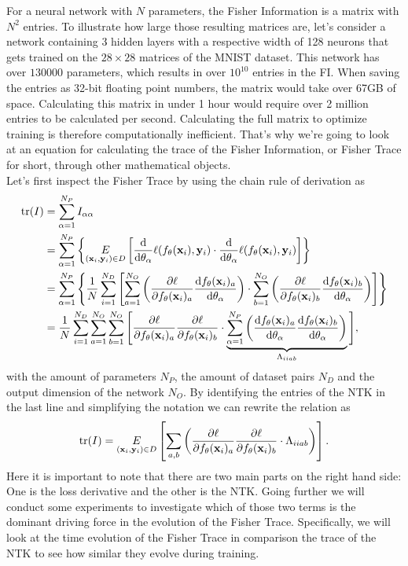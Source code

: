 For a neural network with $N$ parameters, the Fisher Information is a matrix with $N^2$ entries. To illustrate how large those resulting matrices are, let's consider a network containing 3 hidden layers with a respective width of 128 neurons that gets trained on the $28\times28$ matrices of the MNIST dataset. This network has over $130000$ parameters, which results in over $10^{10}$ entries in the FI. When saving the entries as 32-bit floating point numbers, the matrix would take over 67GB of space. Calculating  this matrix in under 1 hour would require over 2 million entries to be calculated per second. Calculating the full matrix to optimize training is therefore computationally inefficient. That's why we're going to look at an equation for calculating the trace of the Fisher Information, or Fisher Trace for short, through other mathematical objects.\\
Let's first inspect the Fisher Trace by using the chain rule of derivation as
\begin{equation}
	\begin{split}
		\mathrm{tr}(I) &= \sum_{\alpha = 1}^{N_P} I_{\alpha\alpha}\\
		&= \sum_{\alpha = 1}^{N_P} \left\{\underset{(\mathbf{x}_i, \mathbf{y}_i) \in D}{E} \left[\frac{\mathrm{d}}{\mathrm{d}\theta_\alpha}\ell(f_\theta(\mathbf{x}_i),\mathbf{y}_i)\cdot \frac{\mathrm{d}}{\mathrm{d}\theta_\alpha}\ell(f_\theta(\mathbf{x}_i),\mathbf{y}_i)\right]\right\}\\
		&= \sum_{\alpha = 1}^{N_P} \left\{ \frac{1}{N} \sum_{i = 1}^{N_D} \left[\sum_{a=1}^{N_O}\left(\frac{\partial\ell}{\partial f_\theta(\mathbf{x}_i)_a}\frac{\mathrm{d}f_\theta(\mathbf{x}_i)_a}{\mathrm{d}\theta_\alpha}\right)\cdot\sum_{b=1}^{N_O}\left(\frac{\partial\ell}{\partial f_\theta(\mathbf{x}_i)_b}\frac{\mathrm{d}f_\theta(\mathbf{x}_i)_b}{\mathrm{d}\theta_\alpha}\right)\right]\right\}\\
		&= \frac{1}{N} \sum_{i = 1}^{N_D} \sum_{a=1}^{N_O} \sum_{b=1}^{N_O} \Bigg[\frac{\partial\ell}{\partial f_\theta(\mathbf{x}_i)_a}\frac{\partial\ell}{\partial f_\theta(\mathbf{x}_i)_b} \cdot\underbrace{ \sum_{\alpha = 1}^{N_P} \left(\frac{\mathrm{d}f_\theta(\mathbf{x}_i)_a}{\mathrm{d}\theta_\alpha}\frac{\mathrm{d}f_\theta(\mathbf{x}_i)_b}{\mathrm{d}\theta_\alpha}\right)}_{\Lambda_{iiab}}\Bigg],
	\end{split} 
\end{equation}
with the amount of parameters $N_P$, the amount of dataset pairs $N_D$ and the output dimension of the network $N_O$. By identifying the entries of the NTK in the last line and simplifying the notation we can rewrite the relation as
\begin{equation}\label{eq:FisherNTKRelation}
	\mathrm{tr}(I) = \underset{(\mathbf{x}_i, \mathbf{y}_i) \in D}{E} \left[\sum_{a,b} \left(\frac{\partial\ell}{\partial f_\theta(\mathbf{x}_i)_a}\frac{\partial\ell}{\partial f_\theta(\mathbf{x}_i)_b} \cdot \Lambda_{iiab}\right)\right].
\end{equation}
Here it is important to note that there are two main parts on the right hand side: One is the loss derivative and the other is the NTK. Going further we will conduct some experiments to investigate which of those two terms is the dominant driving force in the evolution of the Fisher Trace. Specifically, we will look at the time evolution of the Fisher Trace in comparison the trace of the NTK to see how similar they evolve during training.

